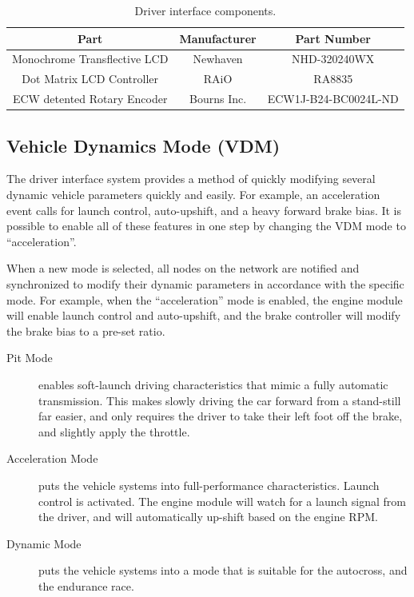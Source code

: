 \begin{table}[H]
	\caption{Driver interface components.}
	\label{table:driver_interface_components}
	\centering
	\begin{tabular}{|c|c|c|}
		\hline 
		Part & Manufacturer & Part Number\tabularnewline
		\hline
		\hline 
		Monochrome Transflective LCD & Newhaven & NHD-320240WX\tabularnewline
		\hline 
		Dot Matrix LCD Controller & RAiO & RA8835\tabularnewline
		\hline 
		ECW detented Rotary Encoder & Bourns Inc. & ECW1J-B24-BC0024L-ND\tabularnewline
		\hline
	\end{tabular}
\end{table}

\subsection{Vehicle Dynamics Mode (VDM)}

The driver interface system provides a method of quickly modifying several dynamic vehicle parameters quickly and easily. For example, an acceleration event calls for launch control, auto-upshift, and a heavy forward brake bias. It is possible to enable all of these features in one step by changing the VDM mode to {}``acceleration''. 

When a new mode is selected, all nodes on the network are notified and synchronized to modify their dynamic parameters in accordance with the specific mode. For example, when the  {}``acceleration'' mode is enabled, the engine module will enable launch control and auto-upshift, and the brake controller will modify the brake bias to a pre-set ratio.

\begin{description}
  \item [{Pit Mode}] enables soft-launch driving characteristics that mimic a fully automatic transmission. This makes slowly driving the car forward from a stand-still far easier, and only requires the driver to take their left foot off the brake, and slightly apply the throttle.
  \item [{Acceleration Mode}] puts the vehicle systems into full-performance characteristics. Launch control is activated. The engine module will watch for a launch signal from the driver, and will automatically up-shift based on the engine RPM.
  \item [{Dynamic Mode}] puts the vehicle systems into a mode that is suitable for the autocross, and the endurance race.
\end{description}


